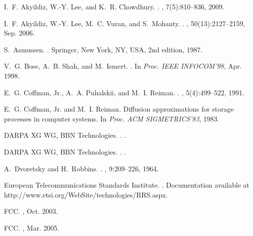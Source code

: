 \documentclass{amsart}
\begin{document}
\begin{thebibliography}{10}

I.~F. Akyildiz, W.-Y. Lee, and K.~R. Chowdhury.
.
, 7(5):810--836, 2009.

I.~F. Akyildiz, W.-Y. Lee, M.~C. Vuran, and S.~Mohanty.
.
, 50(13):2127--2159, Sep. 2006.

S.~Asmussen.
.
\newblock Springer, New York, NY, USA, 2nd edition, 1987.

V.~G. Bose, A.~B. Shah, and M.~Ismert.
.
\newblock In {\em {Proc. IEEE INFOCOM'98}}, Apr. 1998.

E.~G. Coffman, Jr., A.~A. Puhalskii, and M.~I. Reiman.
.
, 5(4):499--522, 1991.

E.~G. Coffman, Jr. and M.~I. Reiman.
\newblock Diffusion approximations for storage processes in computer systems.
\newblock In {\em Proc. ACM SIGMETRICS'83}, 1983.

{DARPA XG WG, BBN Technologies}.
.
.

{DARPA XG WG, BBN Technologies}.
.
.

A.~Dvoretsky and H.~Robbins.
.
, 9:209--226, 1964.

{European Telecommunications Standards Institute}.
.
\newblock Documentation available at
  http://www.etsi.org/WebSite/technologies/RRS.aspx.

{FCC}.
, Oct. 2003.

{FCC}.
, Mar. 2005.


\end{thebibliography}
\end{document}
